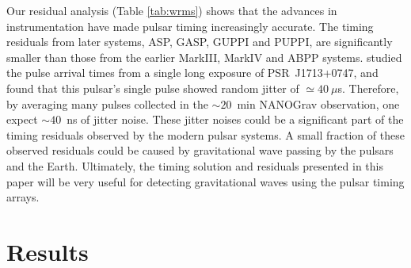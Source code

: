 Our residual analysis (Table \ref{tab:wrms}) shows that the advances in
instrumentation have made pulsar timing increasingly accurate.
The timing residuals from later systems, ASP, GASP, GUPPI and PUPPI, are
significantly smaller than those from the earlier MarkIII, MarkIV and ABPP
systems.
\citet{sc12} studied the pulse arrival times from a single long exposure of
PSR~J1713+0747, and found that this pulsar's single pulse showed random jitter of
$\simeq40~\mu$s. Therefore, by averaging many pulses collected in the
$\sim20$~min NANOGrav observation, one expect $\sim 40$~ns of jitter noise. 
These jitter noises could be a significant part of the timing residuals 
observed by the modern pulsar systems.
A small fraction of these observed residuals could be caused by gravitational
wave passing by the pulsars and the Earth.
Ultimately, the timing solution and residuals presented in this paper
will be very useful for detecting gravitational waves using the pulsar timing
arrays.


\section{Results}
\label{sec:res}

